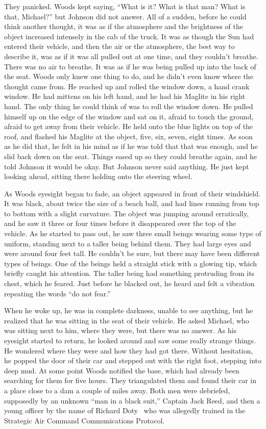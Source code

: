 They panicked. Woods kept saying, ``What is it? What is that man? What is that, Michael?'' but Johnson did not answer.
 All of a sudden, before he could think another thought, it was as if the atmosphere and
the brightness of the object increased intensely in the cab of the truck.
It was as though the Sun had entered their vehicle, and then the air or the atmosphere,
the best way to describe it, was as if it was all pulled out at one time,
and they couldn't breathe. There was no air to breathe.
It was as if he was being pulled up into the back of the seat.
Woods only knew one thing to do, and he didn't even know where the thought came from.
He reached up and rolled the window down, a hand crank window.
He had mittens on his left hand, and he had his Maglite in his right hand.
The only thing he could think of was to roll the window down.
He pulled himself up on the edge of the window and sat on it, afraid to touch the ground, afraid to get away from their vehicle.
He held onto the blue  lights on top of the roof, and  flashed his Maglite at the object, five, six, seven, eight times.
As soon as he did that, he felt in his mind as if he was told that that was enough, and he slid back down on the seat. Things eased up
so they could breathe again, and he told  Johnson it would be okay.
But Johnson never said anything. He just kept looking ahead, sitting there holding onto the steering wheel.

As Woods eyesight began to fade, an object appeared in front of their windshield. It was black, about twice the size of a beach ball, and had lines running from top to bottom with a slight curvature. The object was jumping around erratically, and he saw it three or four times before it disappeared over the top of the vehicle. As he started to pass out, he saw three small beings wearing some type of uniform, standing next to a taller being behind them. They had large eyes and were around four feet tall. He couldn't be sure, but there may have been different types of beings. One of the beings held a straight stick with a glowing tip, which briefly caught his attention. The taller being had something protruding from its chest, which he feared.
Just before he blacked out, he heard and felt a vibration repeating the words ``do not fear.''

When he woke up, he was in complete darkness, unable to see anything, but he realized that he was sitting in the seat of their vehicle.
He asked Michael, who was sitting next to him, where they were, but there was no answer.
As his eyesight started to return, he looked around and saw some really strange things.
He wondered where they were and how they had got there.
Without hesitation, he popped the door of their car and stepped out with the right foot, stepping into deep mud.
At some point Woods notified the base, which had already been searching for them for five hours.
They triangulated them and found their car in a place close to a dam a couple of miles away.
Both men were debriefed, supposedly by an unknown ``man in a black suit,''
Captain Jack Reed, and then a young officer by the name of Richard Doty~\cite{Pilkington2010Sep} who was allegedly
trained in the Strategic Air Command Communications Protocol.


